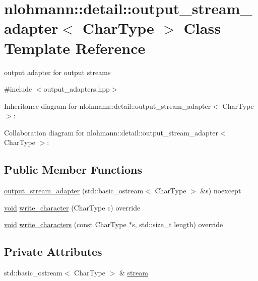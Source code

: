 \hypertarget{classnlohmann_1_1detail_1_1output__stream__adapter}{}\section{nlohmann\+:\+:detail\+:\+:output\+\_\+stream\+\_\+adapter$<$ Char\+Type $>$ Class Template Reference}
\label{classnlohmann_1_1detail_1_1output__stream__adapter}


output adapter for output streams  




{\ttfamily \#include $<$output\+\_\+adapters.\+hpp$>$}



Inheritance diagram for nlohmann\+:\+:detail\+:\+:output\+\_\+stream\+\_\+adapter$<$ Char\+Type $>$\+:


Collaboration diagram for nlohmann\+:\+:detail\+:\+:output\+\_\+stream\+\_\+adapter$<$ Char\+Type $>$\+:
\subsection*{Public Member Functions}
\begin{DoxyCompactItemize}
\item 
\hyperlink{classnlohmann_1_1detail_1_1output__stream__adapter_ae44ed343cb1a716248547f48dd045b6a}{output\+\_\+stream\+\_\+adapter} (std\+::basic\+\_\+ostream$<$ Char\+Type $>$ \&s) noexcept
\item 
\hyperlink{namespacenlohmann_1_1detail_a59fca69799f6b9e366710cb9043aa77d}{void} \hyperlink{classnlohmann_1_1detail_1_1output__stream__adapter_a6e2698c76b200b2d8fac6cebfc43a245}{write\+\_\+character} (Char\+Type c) override
\item 
\hyperlink{namespacenlohmann_1_1detail_a59fca69799f6b9e366710cb9043aa77d}{void} \hyperlink{classnlohmann_1_1detail_1_1output__stream__adapter_ad61375497a7d03cb0bdcddfdaad185d0}{write\+\_\+characters} (const Char\+Type $\ast$s, std\+::size\+\_\+t length) override
\end{DoxyCompactItemize}
\subsection*{Private Attributes}
\begin{DoxyCompactItemize}
\item 
std\+::basic\+\_\+ostream$<$ Char\+Type $>$ \& \hyperlink{classnlohmann_1_1detail_1_1output__stream__adapter_aacc26af02e1e5a988bc5dbfb723b5562}{stream}
\end{DoxyCompactItemize}



